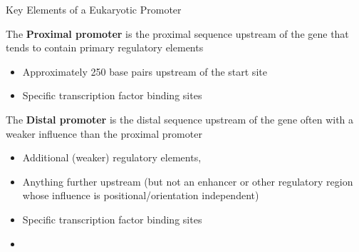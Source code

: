 \documentclass[11pt]{beamer}
\begin{document}
\begin{frame}{Key Elements of a Eukaryotic Promoter}

The \textbf{Proximal promoter} is the proximal sequence upstream of the gene that tends to contain primary regulatory elements

	\begin{itemize}
		\item Approximately 250 base pairs upstream of the start site
		\item Specific transcription factor binding sites
	\end{itemize}

The \textbf{Distal promoter} is the distal sequence upstream of the gene often with a weaker influence than the proximal promoter

	\begin{itemize}
		\item Additional (weaker) regulatory elements, 
		\item Anything further upstream (but not an enhancer or other regulatory region whose influence is positional/orientation independent)
		\item Specific transcription factor binding sites
	\end{itemize}

\end{frame}



\begin{frame}{}

	\begin{itemize}
		\item 
	\end{itemize}

\end{frame}
\end{document}

